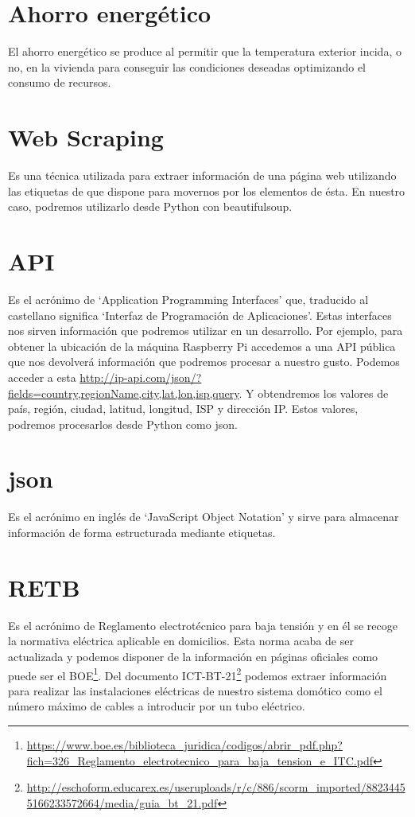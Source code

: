\section{Ahorro energético}
El ahorro energético se produce al permitir que la temperatura exterior incida, o no, en la vivienda para conseguir las condiciones deseadas optimizando el consumo de recursos.

\section{Web Scraping}
Es una técnica utilizada para extraer información de una página web utilizando las etiquetas de que dispone para movernos por los elementos de ésta.
En nuestro caso, podremos utilizarlo desde Python con beautifulsoup.

\section{API}
Es el acrónimo de ‘Application Programming Interfaces’ que, traducido al castellano significa ‘Interfaz de Programación de Aplicaciones’. Estas interfaces nos sirven información que podremos utilizar en un desarrollo.
Por ejemplo, para obtener la ubicación de la máquina Raspberry Pi accedemos a una API pública que nos devolverá información que podremos procesar a nuestro gusto.
Podemos acceder a esta \url{http://ip-api.com/json/?fields=country,regionName,city,lat,lon,isp,query}.
Y obtendremos los valores de país, región, ciudad, latitud, longitud, ISP y dirección IP.
Estos valores, podremos procesarlos desde Python como json.

\section{json}
Es el acrónimo en inglés de ‘JavaScript Object Notation’ y sirve para almacenar información de forma estructurada mediante etiquetas.

\section{RETB}
Es el acrónimo de Reglamento electrotécnico para baja tensión y en él se recoge la normativa eléctrica aplicable en domicilios.
Esta norma acaba de ser actualizada y podemos disponer de la información en páginas oficiales como puede ser el BOE\footnote{\url{https://www.boe.es/biblioteca_juridica/codigos/abrir_pdf.php?fich=326_Reglamento_electrotecnico_para_baja_tension_e_ITC.pdf}}.
Del documento ICT-BT-21\footnote{\url{http://eschoform.educarex.es/useruploads/r/c/886/scorm_imported/88234455166233572664/media/guia_bt_21.pdf}} podemos extraer información para realizar las instalaciones eléctricas de nuestro sistema domótico como el número máximo de cables a introducir por un tubo eléctrico.


